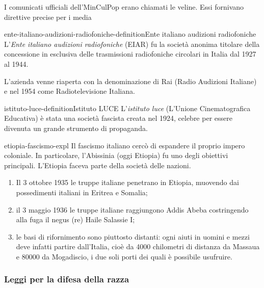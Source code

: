 \documentclass[preview]{standalone}
\begin{document}
\begin{plainhtml}
    I comunicati ufficiali dell'MinCulPop erano chiamati le veline. Essi fornivano direttive precise per i media
\end{plainhtml}

\begin{snippetdefinition}{ente-italiano-audizioni-radiofoniche-definition}{Ente italiano audizioni radiofoniche}
    L'\textit{Ente italiano audizioni radiofoniche} (EIAR) fu la società anonima titolare
    della concessione in esclusiva delle trasmissioni radiofoniche circolari in Italia
    dal 1927 al 1944.
\end{snippetdefinition}

\begin{plainhtml}
    L'azienda venne riaperta con la denominazione di Rai (Radio Audizioni Italiane) e nel 1954 come Radiotelevisione Italiana.
\end{plainhtml}

\begin{snippetdefinition}{istituto-luce-definition}{Istituto LUCE}
    L'\textit{istituto luce} (L'Unione Cinematografica Educativa)
    è stata una società fascista creata nel 1924, celebre per essere divenuta un grande
    strumento di propaganda.
\end{snippetdefinition}

\begin{snippet}{etiopia-fascismo-expl}
    Il fascismo italiano cercò di espandere il proprio impero coloniale.
    In particolare, l'Abissinia (oggi Etiopia) fu uno degli obiettivi principali.
    L'Etiopia faceva parte della società delle nazioni.
    \begin{enumerate}
        \item Il 3 ottobre 1935 le truppe italiane penetrano in Etiopia, muovendo dai possedimenti italiani in Eritrea e Somalia;
        \item il 3 maggio 1936 le truppe italiane raggiungono Addis Abeba costringendo alla fuga il negus (re) Haile Salassie I;
        \item le basi di rifornimento sono piuttosto distanti: ogni aiuti in uomini e mezzi deve infatti partire dall'Italia, cioè da 4000 chilometri di distanza da Massaua e 80000 da Mogadiscio, i due soli porti dei quali è possibile usufruire.
    \end{enumerate}
\end{snippet}

\subsubsection{Leggi per la difesa della razza}
\end{document}
